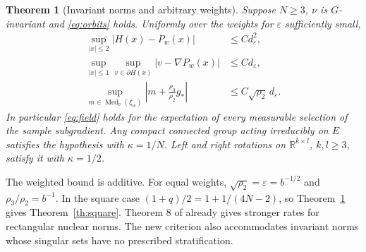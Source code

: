\documentclass[10pt,letterpaper]{article}
\newtheorem{theorem}{Theorem}
\newcommand{\R}{\mathbb R}
\newcommand{\Med}{\operatorname{Med}}
\newcommand{\eps}{\varepsilon}
\newcommand{\gstar}{g_{\!*}}
\begin{document}
\begin{theorem}[Invariant norms and arbitrary weights]\label{th:group}
Suppose $N\ge3$, $\nu$ is $G$-invariant and \eqref{eq:orbits} holds. Uniformly over the weights for $\eps$ sufficiently small,
\begin{align}
 \sup_{|x|\le2}|H(x)-P_w(x)|&\le C d_\eps^2,\label{eq:value}\\
 \sup_{|x|\le1}\sup_{v\in\partial H(x)}
       |v-\nabla P_w(x)|&\le C d_\eps,\label{eq:field}\\
 \sup_{m\in\Med_\nu(\xi_w)}
       \left|m+\frac{\rho_3}{\rho_2}\gstar\right|
       &\le C\sqrt{\rho_2}\,d_\eps.\label{eq:median}
\end{align}
In particular \eqref{eq:field} holds for the expectation of every measurable selection of the sample subgradient. Any compact connected group acting irreducibly on $E$ satisfies the hypothesis with $\kappa=1/N$. Left and right rotations on $\R^{k\times l}$, $k,l\ge3$, satisfy it with $\kappa=1/2$.
\end{theorem}

The weighted bound is additive. For equal weights, $\sqrt{\rho_2}=\eps=b^{-1/2}$ and $\rho_3/\rho_2=b^{-1}$. In the square case $(1+q)/2=1+1/(4N-2)$, so Theorem~\ref{th:group} gives Theorem~\ref{th:square}. Theorem 8 of \cite{db} already gives stronger rates for rectangular nuclear norms. The new criterion also accommodates invariant norms whose singular sets have no prescribed stratification.
\end{document}
